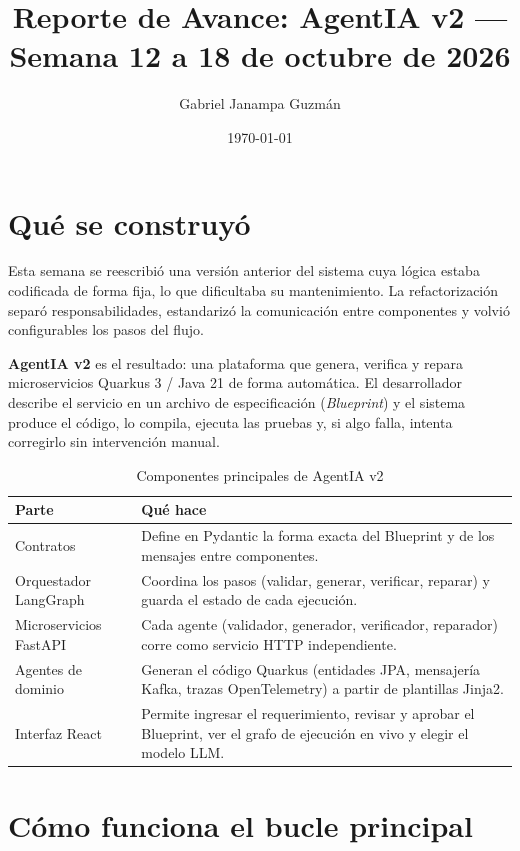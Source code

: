 \documentclass[11pt,a4paper]{article}
\title{\textbf{Reporte de Avance: AgentIA v2 --- Semana 12 a 18 de octubre de 2026}}
\author{Gabriel Janampa Guzmán}
\date{\today}
\begin{document}
\maketitle

\section{Qué se construyó}

Esta semana se reescribió una versión anterior del sistema cuya lógica estaba codificada de forma fija, lo que dificultaba su mantenimiento. La refactorización separó responsabilidades, estandarizó la comunicación entre componentes y volvió configurables los pasos del flujo.

\textbf{AgentIA v2} es el resultado: una plataforma que genera, verifica y repara microservicios Quarkus 3 / Java 21 de forma automática. El desarrollador describe el servicio en un archivo de especificación (\textit{Blueprint}) y el sistema produce el código, lo compila, ejecuta las pruebas y, si algo falla, intenta corregirlo sin intervención manual.

\begin{table}[htbp]
\centering
\footnotesize
\renewcommand{\arraystretch}{1.3}
\begin{tabularx}{\textwidth}{@{}l >{\raggedright\arraybackslash}X@{}}
\toprule
\textbf{Parte} & \textbf{Qué hace} \\ \midrule
Contratos & Define en Pydantic la forma exacta del Blueprint y de los mensajes entre componentes. \\
Orquestador LangGraph & Coordina los pasos (validar, generar, verificar, reparar) y guarda el estado de cada ejecución. \\
Microservicios FastAPI & Cada agente (validador, generador, verificador, reparador) corre como servicio HTTP independiente. \\
Agentes de dominio & Generan el código Quarkus (entidades JPA, mensajería Kafka, trazas OpenTelemetry) a partir de plantillas Jinja2. \\
Interfaz React & Permite ingresar el requerimiento, revisar y aprobar el Blueprint, ver el grafo de ejecución en vivo y elegir el modelo LLM. \\
\bottomrule
\end{tabularx}
\caption{Componentes principales de AgentIA v2}
\end{table}

\section{Cómo funciona el bucle principal}
\end{document}

